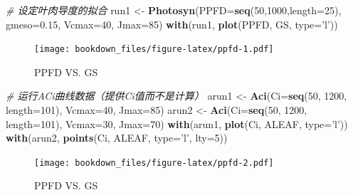 \documentclass[
]{krantz}
\makeatletter
\newenvironment{Shaded}{\begin{snugshade}}{\end{snugshade}}
\newcommand{\CommentTok}[1]{\textcolor[rgb]{0.56,0.35,0.01}{\textit{#1}}}
\newcommand{\DataTypeTok}[1]{\textcolor[rgb]{0.13,0.29,0.53}{#1}}
\newcommand{\DecValTok}[1]{\textcolor[rgb]{0.00,0.00,0.81}{#1}}
\newcommand{\FloatTok}[1]{\textcolor[rgb]{0.00,0.00,0.81}{#1}}
\newcommand{\KeywordTok}[1]{\textcolor[rgb]{0.13,0.29,0.53}{\textbf{#1}}}
\newcommand{\NormalTok}[1]{#1}
\newcommand{\StringTok}[1]{\textcolor[rgb]{0.31,0.60,0.02}{#1}}
\newenvironment{kframe}{%
\medskip{}
\setlength{\fboxsep}{.8em}
 \def\at@end@of@kframe{}%
 \ifinner\ifhmode%
  \def\at@end@of@kframe{\end{minipage}}%
  \begin{minipage}{\columnwidth}%
 \fi\fi%
 \def\FrameCommand##1{\hskip\@totalleftmargin \hskip-\fboxsep
 \colorbox{shadecolor}{##1}\hskip-\fboxsep
     \hskip-\linewidth \hskip-\@totalleftmargin \hskip\columnwidth}%
 \MakeFramed {\advance\hsize-\width
   \@totalleftmargin\z@ \linewidth\hsize
   \@setminipage}}%
 {\par\unskip\endMakeFramed%
 \at@end@of@kframe}
\renewenvironment{Shaded}{\begin{kframe}}{\end{kframe}}
\makeatother
\begin{document}
\begin{Shaded}
\begin{Highlighting}[]
\CommentTok{# 设定叶肉导度的拟合}
\NormalTok{run1 <-}\StringTok{ }\KeywordTok{Photosyn}\NormalTok{(}\DataTypeTok{PPFD=}\KeywordTok{seq}\NormalTok{(}\DecValTok{50}\NormalTok{,}\DecValTok{1000}\NormalTok{,}\DataTypeTok{length=}\DecValTok{25}\NormalTok{), }
                 \DataTypeTok{gmeso=}\FloatTok{0.15}\NormalTok{, }\DataTypeTok{Vcmax=}\DecValTok{40}\NormalTok{, }\DataTypeTok{Jmax=}\DecValTok{85}\NormalTok{)}
\KeywordTok{with}\NormalTok{(run1, }\KeywordTok{plot}\NormalTok{(PPFD, GS, }\DataTypeTok{type=}\StringTok{'l'}\NormalTok{))}
\end{Highlighting}
\end{Shaded}

\begin{figure}
\centering
\texttt{[image: bookdown\_files/figure-latex/ppfd-1.pdf]}
\caption{\label{fig:ppfd1}PPFD VS. GS}
\end{figure}

\begin{Shaded}
\begin{Highlighting}[]
\CommentTok{# 运行ACi曲线数据（提供Ci值而不是计算）}
\NormalTok{arun1 <-}\StringTok{ }\KeywordTok{Aci}\NormalTok{(}\DataTypeTok{Ci=}\KeywordTok{seq}\NormalTok{(}\DecValTok{50}\NormalTok{, }\DecValTok{1200}\NormalTok{, }\DataTypeTok{length=}\DecValTok{101}\NormalTok{), }
             \DataTypeTok{Vcmax=}\DecValTok{40}\NormalTok{, }\DataTypeTok{Jmax=}\DecValTok{85}\NormalTok{)}
\NormalTok{arun2 <-}\StringTok{ }\KeywordTok{Aci}\NormalTok{(}\DataTypeTok{Ci=}\KeywordTok{seq}\NormalTok{(}\DecValTok{50}\NormalTok{, }\DecValTok{1200}\NormalTok{, }\DataTypeTok{length=}\DecValTok{101}\NormalTok{), }
             \DataTypeTok{Vcmax=}\DecValTok{30}\NormalTok{, }\DataTypeTok{Jmax=}\DecValTok{70}\NormalTok{)}
\KeywordTok{with}\NormalTok{(arun1, }\KeywordTok{plot}\NormalTok{(Ci, ALEAF, }\DataTypeTok{type=}\StringTok{'l'}\NormalTok{))}
\KeywordTok{with}\NormalTok{(arun2, }\KeywordTok{points}\NormalTok{(Ci, ALEAF, }\DataTypeTok{type=}\StringTok{'l'}\NormalTok{, }\DataTypeTok{lty=}\DecValTok{5}\NormalTok{))}
\end{Highlighting}
\end{Shaded}

\begin{figure}
\centering
\texttt{[image: bookdown\_files/figure-latex/ppfd-2.pdf]}
\caption{\label{fig:ppfd2}PPFD VS. GS}
\end{figure}
\end{document}
